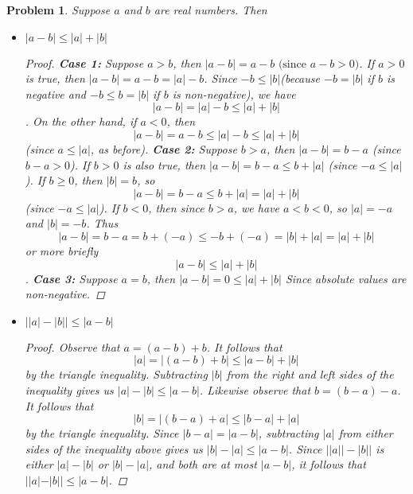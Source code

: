 \documentclass[12pt]{article}
\newtheorem{problem}{Problem}
\begin{document}
\begin{problem} %
Suppose $a$ and $b$ are real numbers.  Then
\begin{itemize}
\item[(a)] $|a-b| \le |a|+|b|$
	\begin{proof}
		\textbf{Case 1:} Suppose $a > b$, then $|a - b| = a - b \text{ (since $a-b > 0$)}$. If $a > 0$ is true, then $|a - b| = a - b = |a| - b$. Since $-b \leq |b|$(because $-b = |b|$ if $b$ is negative and $-b \leq b = |b|$ if $b$ is non-negative), we have $$|a - b| = |a| - b \leq |a| + |b|$$. On the other hand, if $a < 0$, then $$|a - b| = a - b \leq |a| - b \leq |a| + |b|$$ (since $a \leq |a|$, as before). \newline
		\textbf{Case 2:} Suppose $b > a$, then $|a - b| = b - a$ (since $b - a > 0$). If $b > 0$ is also true, then $|a-b| = b- a \leq b + |a|$ (since $-a \leq |a|$). \newline
		If $b \geq 0$, then $|b| = b$, so $$|a-b| = b - a \leq b + |a| = |a| + |b| $$ (since $-a \leq |a|$). \newline If $b < 0$, then since $b > a$, we have $a < b < 0$, so $|a| = -a$ and $|b| = -b$. Thus $$|a-b| = b - a = b + (-a) \leq -b + (-a) = |b| + |a| = |a|+|b|$$ or more briefly
		$$|a-b| \leq |a | + |b|$$. \newline
		\textbf{Case 3:} Suppose $a = b$, then $|a - b| = 0 \leq |a| + |b|$ Since absolute values are non-negative.
	\end{proof}
\item[(b)] $\big||a|-|b|\big| \le |a-b|$
	\begin{proof}
		Observe that $a = (a - b) + b$. It follows that
		$$	|a| = |(a - b) + b| \leq |a - b| + |b|$$
		by the triangle inequality. Subtracting $|b|$ from the right and left sides of the inequality gives us
		$|a| - |b| \leq |a - b|$. Likewise observe that $b = (b - a) - a$. It follows that
		$$ |b| = |(b-a) + a| \leq |b - a| + |a|$$ by the triangle inequality. Since $|b - a | = |a - b|$, subtracting $|a|$ from either sides of the inequality above gives us $|b| - |a| \leq |a - b|$. Since $||a|| - |b||$ is either $|a| - |b|$ or $|b| - |a|$, and both are at most $|a - b|$, it follows that $||a| - |b|| \leq |a - b|$.
	\end{proof}
\end{itemize}
\end{problem}

\end{document}
